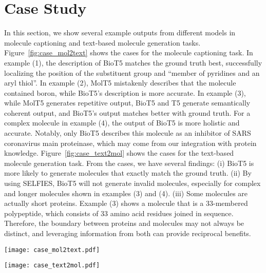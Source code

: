 \documentclass[11pt]{article}
\newcommand{\method}{{BioT5}}
\begin{document}
\section{Case Study}
\label{sec:case_study}
In this section, we show several example outputs from different models in molecule captioning and text-based molecule generation tasks.
Figure~\ref{fig:case_mol2text} shows the cases for the molecule captioning task.
In example (1), the description of \method{} matches the ground truth best, successfully localizing the position of the substituent group and ``member of pyridines and an aryl thiol''.
In example (2), MolT5 mistakenly describes that the molecule contained boron, while \method's description is more accurate.
In example (3), while MolT5 generates repetitive output, \method{} and T5 generate semantically coherent output, and \method{}'s output matches better with ground truth.
For a complex molecule in example (4), the output of \method{} is more holistic and accurate.
Notably, only \method{} describes this molecule as an inhibitor of SARS coronavirus main proteinase, which may come from our integration with protein knowledge.
Figure~\ref{fig:case_text2mol} shows the cases for the text-based molecule generation task.
From the cases, we have several findings:
(i) \method{} is more likely to generate molecules that exactly match the ground truth.
(ii) By using SELFIES, \method{} will not generate invalid molecules, especially for complex and longer molecules shown in examples (3) and (4).
(iii) Some molecules are actually short proteins. Example (3) shows a molecule that is a 33-membered polypeptide, which consists of $33$ amino acid residues joined in sequence. Therefore, the boundary between proteins and molecules may not always be distinct, and leveraging information from both can provide reciprocal benefits.

\begin{figure*}[t]
    \centering
\texttt{[image: case\_mol2text.pdf]}
    \caption{Molecule captioning cases.}
    \label{fig:case_mol2text}
\end{figure*}

\begin{figure*}[t]
    \centering
\texttt{[image: case\_text2mol.pdf]}
    \caption{Text-based molecule generation cases.}
    \label{fig:case_text2mol}
\end{figure*}
\end{document}
